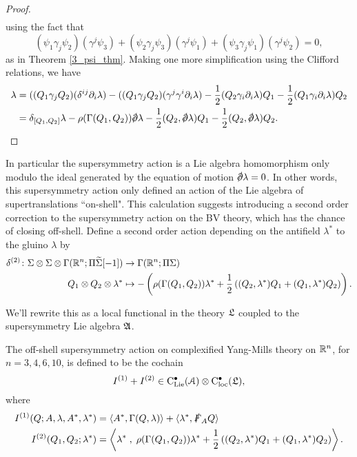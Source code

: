 \documentclass[10pt, oneside]{article}
\begin{document}
\begin{proof}
\begin{align*}
\end{align*}
using the fact that 
\[(\psi_1 \gamma_j \psi_2)(\gamma^j \psi_3) + (\psi_2 \gamma_j \psi_3)(\gamma^j \psi_1) + (\psi_3 \gamma_j \psi_1)(\gamma^j \psi_2) = 0,\]
as in Theorem \ref{3_psi_thm}.  Making one more simplification using the Clifford relations, we have
\begin{align*}
[\delta_{Q_1}, \delta_{Q_2}] \lambda &= ((Q_1 \gamma_j Q_2) (\delta^{ij} \dd_i \lambda) - ((Q_1 \gamma_j Q_2) (\gamma^j \gamma^i \dd_i \lambda) - \frac 12(Q_2 \gamma_i \dd_i \lambda)Q_1 - \frac 12(Q_1 \gamma_i \dd_i \lambda)Q_2 \\
&= \delta_{[Q_1,Q_2]} \lambda - \rho(\Gamma(Q_1,Q_2)) \sd \dd \lambda - \frac 12(Q_2, \sd \dd \lambda)Q_1 - \frac 12(Q_2, \sd \dd \lambda)Q_2.
\end{align*}
\end{proof}

In particular the supersymmetry action is a Lie algebra homomorphism only modulo the ideal generated by the equation of motion $\sd \dd \lambda = 0$.
In other words, this supersymmetry action only defined an action of the Lie algebra of supertranslations ``on-shell".  This calculation suggests introducing a second order correction to the supersymmetry action on the BV theory, which has the chance of closing off-shell.  Define a second order action depending on the antifield $\lambda^*$ to the gluino $\lambda$ by
\begin{align*}
\delta^{(2)} \colon \Sigma \otimes \Sigma \otimes \Gamma(\mathbb R^{n}; \Pi \widetilde{\Sigma}[-1]) &\to \Gamma(\mathbb R^{n}; \Pi \Sigma) \\
Q_1 \otimes Q_2 \otimes \lambda^* &\mapsto - \left(\rho(\Gamma(Q_1,Q_2)) \lambda^* + \frac 12 \left((Q_2, \lambda^*)Q_1 + (Q_1, \lambda^*)Q_2\right)\right).
\end{align*}

We'll rewrite this as a local functional in the theory $\mathfrak L$ coupled to the supersymmetry Lie algebra $\mathfrak{A}$.

\begin{definition}
The off-shell supersymmetry action on complexified Yang-Mills theory on $\mathbb R^{n}$, for $n=3,4,6,10$, is defined to be the cochain
\[I^{(1)} + I^{(2)} \in {\rm C}_{\rm Lie}^\bullet(\mathcal{A}) \otimes {\rm C}_{\rm loc}^\bullet(\mathfrak L),\]
where 
\begin{align*}
I ^{(1)} (Q ; A, \lambda, A^*, \lambda^*) & = \langle A^* , \Gamma(Q, \lambda)\rangle + \langle\lambda^*, \slashed{F}_A Q\rangle \\
I^{(2)} (Q_1,Q_2 ; \lambda^*) & =  \left\langle\lambda^* \;,\; \rho(\Gamma(Q_1,Q_2)) \lambda^* + \frac 12 \left((Q_2, \lambda^*)Q_1 + (Q_1, \lambda^*)Q_2\right)\right\rangle .
\end{align*}
\end{definition}
\end{document}
